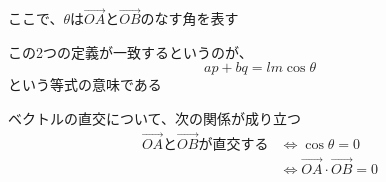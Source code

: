 \documentclass[../book_jiriki_calc]{subfiles}
\begin{document}
ここで、$\theta$は$\overrightarrow{OA}$と$\overrightarrow{OB}$のなす角を表す

\sectionline

この2つの定義が一致するというのが、
\begin{equation*}
  ap + bq = lm\cos\theta
\end{equation*}
という等式の意味である

\sectionline

ベクトルの直交について、次の関係が成り立つ
\begin{align*}
  \overrightarrow{OA}\text{と}\overrightarrow{OB}\text{が直交する}
   & \Leftrightarrow \cos\theta = 0                                  \\
   & \Leftrightarrow \overrightarrow{OA}\cdot\overrightarrow{OB} = 0
\end{align*}
\end{document}
